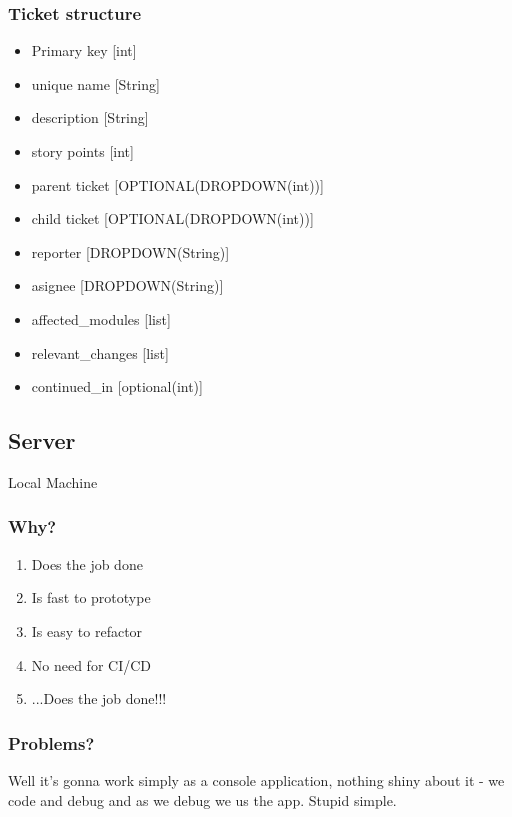 \subsubsection{Ticket structure}
\begin{itemize}
  \item Primary key       [int]
  \item unique name       [String]
  \item description       [String]
  \item story points      [int]
  \item parent ticket     [OPTIONAL(DROPDOWN(int))]
  \item child ticket      [OPTIONAL(DROPDOWN(int))]
  \item reporter          [DROPDOWN(String)]
  \item asignee           [DROPDOWN(String)]
  \item affected\_modules [list]
  \item relevant\_changes [list]
  \item continued\_in     [optional(int)]
\end{itemize}

\subsection{Server}\label{SRV:POC}
Local Machine
\subsubsection{Why?}
\begin{enumerate}
    \item Does the job done
    \item Is fast to prototype
    \item Is easy to refactor
    \item No need for CI/CD
    \item ...Does the job done!!!
\end{enumerate}
\subsubsection{Problems?}
Well it's gonna work simply as a console application, nothing shiny about it - we code and debug and as we debug we us the app. Stupid simple. 
\newpage

